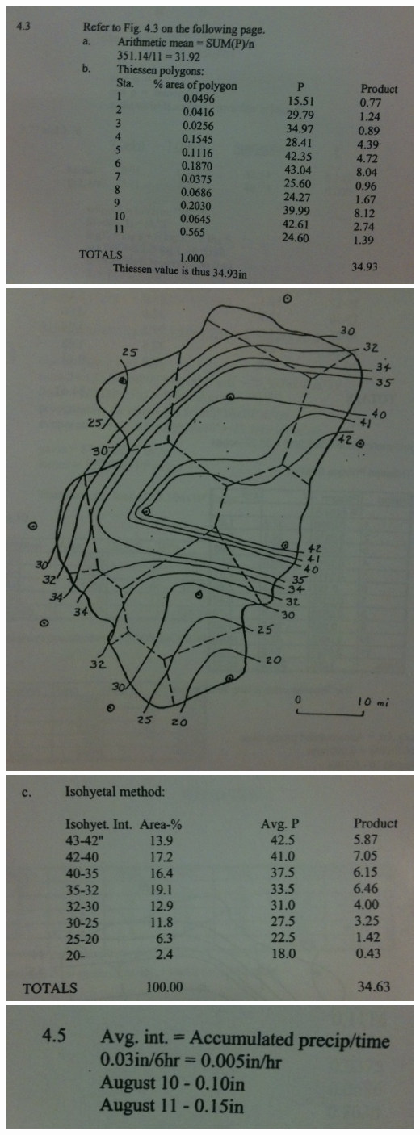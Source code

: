 \documentclass[11pt]{article}
\begin{document}
\includegraphics[width=\textwidth]{4_3-1.jpg}
\includegraphics[width=\textwidth]{4_3-2.jpg}
\includegraphics[width=\textwidth]{4_3-3.jpg}
\includegraphics[width=.8\textwidth]{4_5.jpg}
\end{document}
